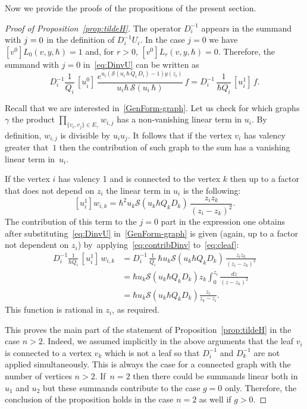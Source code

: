 \documentclass[JEP,XML,SOM,Unicode,NoEqCountersInSection,NoFloatCountersInSection]{cedram}
\let\mathcal\mathscr
\theoremstyle{plain}
\theoremstyle{definition}
\theoremstyle{remark}
\newcommand{\cS}{\mathcal{S}}
\begin{document}
Now we provide the proofs of the propositions of the present section.
\begin{proof}[Proof of Proposition~\ref{prop:tildeH}]
The operator $D_{i}^{-1}$ appears in the summand with $j=\nobreak0$ in the definition of $D_i^{-1}U_i$. In the case $j=0$ we have $[v^0]L_0(v,y,\hbar)=1$ and, for $r>0$, $[v^0]L_r(v,y,\hbar)=0$. Therefore, the summand with $j=0$ in~\eqref{eq:DinvU} can be written as
\begin{equation}\label{eq:contribDinv}
D_i^{-1}\frac{1}{Q_i}\,
[u_i^0]\, \frac{e^{u_i(\cS(u_i\,\hbar\,Q_i\,D_i)-1)y(z_i)}}{u_i\hbar\,\cS(u_i\,\hbar)}\,f=
D_{i}^{-1}\,\frac{1}{\hbar Q_i}\,[u_i^1]\,f.
\end{equation}

Recall that we are interested in~\eqref{GenForm-graph}.
Let us check for which graphs~$\gamma$ the product $\prod_{\{v_i,v_j\}\in E_\gamma} w_{i,j}$ has a non-vanishing linear term in $u_i$. By definition, $w_{i,j}$ is divisible by $u_iu_j$. It follows that if the vertex $v_i$ has valency greater that~$1$ then the contribution of such graph to the sum has a vanishing linear term in~$u_i$.

If the vertex $i$ has valency 1 and is connected to the vertex $k$ then up to a factor that does not depend on $z_i$ the linear term in $u_i$ is the following:
\begin{equation}\label{eq:cleaf}
[u_i^1]w_{i,k} = \hbar^2 u_k \cS(u_k\hbar Q_kD_k)\,\frac{z_iz_k}{(z_i-z_k)^2}.
\end{equation}
The contribution of this term to the $j=0$ part in the expression one obtains after substituting~\eqref{eq:DinvU} in~\eqref{GenForm-graph} is given (again, up to a factor not dependent on $z_i$) by~applying~\eqref{eq:contribDinv} to~\eqref{eq:cleaf}:
\begin{equation} \label{eq:leafexpr}
\begin{aligned}
D_{i}^{-1}\frac{1}{\hbar Q_i}\,[u_i^1]\,w_{i,k}
&=D_{i}^{-1}\,\frac{1}{Q_i}\,\hbar u_k \cS(u_k\hbar Q_kD_k)\,\frac{z_iz_k}{(z_i-z_k)^2}\\
&=\hbar u_k \cS(u_k\hbar Q_kD_k)z_k\int_0^{z_i}\frac{dz}{(z-z_k)^2}
\\
& =\hbar u_k \cS(u_k\hbar Q_kD_k)\frac{z_i}{z_k-z_i}.
\end{aligned}
\end{equation}
This function is rational in $z_i$, as required.

This proves the main part of the statement of Proposition~\ref{prop:tildeH} in the case $n>2$. Indeed, we assumed implicitly in the above arguments that the leaf $v_i$ is connected to a vertex $v_k$ which is not a leaf so that $D_i^{-1}$ and $D_k^{-1}$ are not applied simultaneously. This is always the case for a connected graph with the number of vertices $n>2$. If~$n=2$ then there could be summands linear both in $u_1$ and $u_2$ but these summands contribute to the case $g=0$ only. Therefore, the conclusion of the proposition holds in the case $n=2$ as well if $g>0$.


\end{proof}
\end{document}
